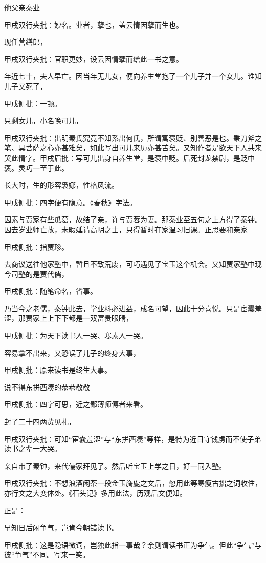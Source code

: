 \begin{parag}
    他父亲秦业\begin{note}甲戌双行夹批：妙名。业者，孽也，盖云情因孽而生也。\end{note}现任营缮郎，\begin{note}甲戌双行夹批：官职更妙，设云因情孽而缮此一书之意。\end{note}年近七十，夫人早亡。因当年无儿女，便向养生堂抱了一个儿子并一个女儿。谁知儿子又死了，\begin{note}甲戌侧批：一顿。\end{note}只剩女儿，小名唤可儿，\begin{note}甲戌双行夹批：出明秦氏究竟不知系出何氏，所谓寓褒贬、别善恶是也。秉刀斧之笔、具菩萨之心亦甚难矣，如此写出可儿来历亦甚苦矣。又知作者是欲天下人共来哭此情字。甲戌眉批：写可儿出身自养生堂，是褒中贬。后死封龙禁尉，是贬中褒。灵巧一至于此。\end{note}长大时，生的形容袅娜，性格风流。\begin{note}甲戌侧批：四字便有隐意。《春秋》字法。\end{note}因素与贾家有些瓜葛，故结了亲，许与贾蓉为妻。那秦业至五旬之上方得了秦钟。因去岁业师亡故，未暇延请高明之士，只得暂时在家温习旧课。正思要和亲家\begin{note}甲戌侧批：指贾珍。\end{note}去商议送往他家塾中，暂且不致荒废，可巧遇见了宝玉这个机会。又知贾家塾中现今司塾的是贾代儒，\begin{note}甲戌侧批：随笔命名，省事。\end{note}乃当今之老儒，秦钟此去，学业料必进益，成名可望，因此十分喜悦。只是宦囊羞涩，那贾家上上下下都是一双富贵眼睛，\begin{note}甲戌侧批：为天下读书人一哭、寒素人一哭。\end{note}容易拿不出来，又恐误了儿子的终身大事，\begin{note}甲戌侧批：原来读书是终生大事。\end{note}说不得东拼西凑的恭恭敬敬\begin{note}甲戌侧批：四字可思，近之鄙薄师傅者来看。\end{note}封了二十四两贽见礼，\begin{note}甲戌双行夹批：可知“宦囊羞涩”与“东拼西凑”等样，是特为近日守钱虏而不使子弟读书之辈一大哭。\end{note}亲自带了秦钟，来代儒家拜见了。然后听宝玉上学之日，好一同入塾。\begin{note}甲戌双行夹批：不想浪酒闲茶一段金玉旖旎之文后，忽用此等寒瘦古拙之词收住，亦行文之大变体处。《石头记》多用此法，历观后文便知。\end{note}正是：
\end{parag}


\begin{poem}
    \begin{pl}早知日后闲争气，岂肯今朝错读书。\end{pl}
    \begin{note}甲戌侧批：这是隐语微词，岂独此指一事哉？余则谓读书正为争气。但此“争气”与彼“争气”不同。写来一笑。\end{note}
\end{poem}